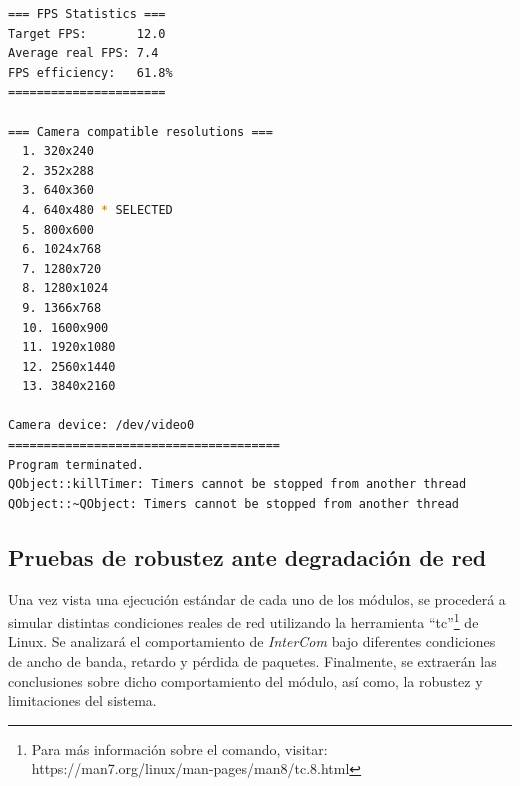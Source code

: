 \begin{lstlisting}[language=bash,basicstyle=\ttfamily\scriptsize]
=== FPS Statistics ===
Target FPS:       12.0
Average real FPS: 7.4
FPS efficiency:   61.8%
======================

=== Camera compatible resolutions ===
  1. 320x240
  2. 352x288
  3. 640x360
  4. 640x480 * SELECTED
  5. 800x600
  6. 1024x768
  7. 1280x720
  8. 1280x1024
  9. 1366x768
  10. 1600x900
  11. 1920x1080
  12. 2560x1440
  13. 3840x2160

Camera device: /dev/video0
======================================
Program terminated.
QObject::killTimer: Timers cannot be stopped from another thread
QObject::~QObject: Timers cannot be stopped from another thread
\end{lstlisting}
\vspace{\baselineskip}

\newpage
\subsection{Pruebas de robustez ante degradación de red}

Una vez vista una ejecución estándar de cada uno de los módulos, se procederá a simular distintas condiciones reales de red utilizando la herramienta ``tc''\footnote{Para más información sobre el comando, visitar: https://man7.org/linux/man-pages/man8/tc.8.html} de Linux. Se analizará el comportamiento de \textit{InterCom} bajo diferentes condiciones de ancho de banda, retardo y pérdida de paquetes. Finalmente, se extraerán las conclusiones sobre dicho comportamiento del módulo, así como, la robustez y limitaciones del sistema.
\vspace{\baselineskip}

